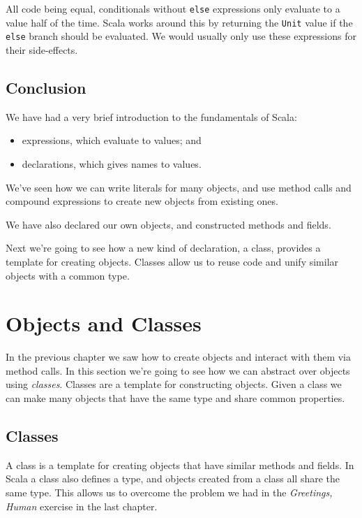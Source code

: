 \documentclass[11pt,a5paper,]{book}
\providecommand{\tightlist}{%
  \setlength{\itemsep}{0pt}\setlength{\parskip}{0pt}}
\begin{document}
All code being equal, conditionals without \texttt{else} expressions
only evaluate to a value half of the time. Scala works around this by
returning the \texttt{Unit} value if the \texttt{else} branch should be
evaluated. We would usually only use these expressions for their
side-effects.

\hypertarget{conclusion}{%
\section{Conclusion}\label{conclusion}}

We have had a very brief introduction to the fundamentals of Scala:

\begin{itemize}
\tightlist
\item
  expressions, which evaluate to values; and
\item
  declarations, which gives names to values.
\end{itemize}

We've seen how we can write literals for many objects, and use method
calls and compound expressions to create new objects from existing ones.

We have also declared our own objects, and constructed methods and
fields.

Next we're going to see how a new kind of declaration, a class, provides
a template for creating objects. Classes allow us to reuse code and
unify similar objects with a common type.

\hypertarget{objects-and-classes}{%
\chapter{Objects and Classes}\label{objects-and-classes}}

In the previous chapter we saw how to create objects and interact with
them via method calls. In this section we're going to see how we can
abstract over objects using \emph{classes}. Classes are a template for
constructing objects. Given a class we can make many objects that have
the same type and share common properties.

\hypertarget{classes}{%
\section{Classes}\label{classes}}

A class is a template for creating objects that have similar methods and
fields. In Scala a class also defines a type, and objects created from a
class all share the same type. This allows us to overcome the problem we
had in the \emph{Greetings, Human} exercise in the last chapter.
\end{document}
